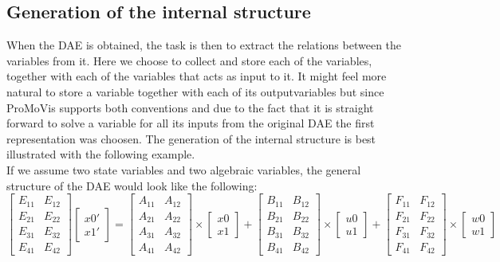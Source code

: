 \subsection{Generation of the internal structure}
When the DAE is obtained, the task is then to extract the relations between the variables from it. Here we choose to collect and store each of the variables, together with each of the variables that acts as input to it. It might feel more natural to store a variable together with each of its outputvariables but since ProMoVis supports both conventions and due to the fact that it is straight forward to solve a variable for all its inputs from the original DAE the first representation was choosen.
The generation of the internal structure is best illustrated with the following example.\\\newline
If we assume two state variables and two algebraic variables, the general structure of the DAE would look like the following:\\\newline
$
\begin{bmatrix} E_{11} & E_{12} \\ E_{21} & E_{22} \\ E_{31} & E_{32} \\ E_{41} & E_{42} \end{bmatrix} \left[ \begin{array}{c} x0' \\ x1' \end{array} \right]
= \begin{bmatrix} A_{11} & A_{12} \\ A_{21} & A_{22} \\ A_{31} & A_{32} \\ A_{41} & A_{42} \end{bmatrix} \times \left[ \begin{array}{c} x0 \\ x1 \end{array} \right] + \begin{bmatrix} B_{11} & B_{12} \\ B_{21} & B_{22} \\ B_{31} & B_{32} \\ B_{41} & B_{42} \end{bmatrix} \times \left[ \begin{array}{c} u0 \\ u1 \end{array} \right]+
\begin{bmatrix} F_{11} & F_{12} \\ F_{21} & F_{22} \\ F_{31} & F_{32} \\ F_{41} & F_{42}\end{bmatrix} \times \left[ \begin{array}{c} w0 \\ w1 \end{array} \right]$

